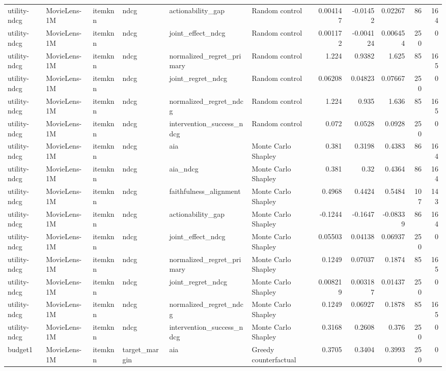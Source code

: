 \begin{table}[t]
{\begin{tabular}{llllllrrrrr}
utility-ndcg & MovieLens-1M & itemknn & ndcg & actionability\_gap & Random control & 0.004147 & -0.01452 & 0.02267 & 86 & 164 \\
utility-ndcg & MovieLens-1M & itemknn & ndcg & joint\_effect\_ndcg & Random control & 0.001172 & -0.004124 & 0.006454 & 250 & 0 \\
utility-ndcg & MovieLens-1M & itemknn & ndcg & normalized\_regret\_primary & Random control & 1.224 & 0.9382 & 1.625 & 85 & 165 \\
utility-ndcg & MovieLens-1M & itemknn & ndcg & joint\_regret\_ndcg & Random control & 0.06208 & 0.04823 & 0.07667 & 250 & 0 \\
utility-ndcg & MovieLens-1M & itemknn & ndcg & normalized\_regret\_ndcg & Random control & 1.224 & 0.935 & 1.636 & 85 & 165 \\
utility-ndcg & MovieLens-1M & itemknn & ndcg & intervention\_success\_ndcg & Random control & 0.072 & 0.0528 & 0.0928 & 250 & 0 \\
utility-ndcg & MovieLens-1M & itemknn & ndcg & aia & Monte Carlo Shapley & 0.381 & 0.3198 & 0.4383 & 86 & 164 \\
utility-ndcg & MovieLens-1M & itemknn & ndcg & aia\_ndcg & Monte Carlo Shapley & 0.381 & 0.32 & 0.4364 & 86 & 164 \\
utility-ndcg & MovieLens-1M & itemknn & ndcg & faithfulness\_alignment & Monte Carlo Shapley & 0.4968 & 0.4424 & 0.5484 & 107 & 143 \\
utility-ndcg & MovieLens-1M & itemknn & ndcg & actionability\_gap & Monte Carlo Shapley & -0.1244 & -0.1647 & -0.08339 & 86 & 164 \\
utility-ndcg & MovieLens-1M & itemknn & ndcg & joint\_effect\_ndcg & Monte Carlo Shapley & 0.05503 & 0.04138 & 0.06937 & 250 & 0 \\
utility-ndcg & MovieLens-1M & itemknn & ndcg & normalized\_regret\_primary & Monte Carlo Shapley & 0.1249 & 0.07037 & 0.1874 & 85 & 165 \\
utility-ndcg & MovieLens-1M & itemknn & ndcg & joint\_regret\_ndcg & Monte Carlo Shapley & 0.008219 & 0.003187 & 0.01437 & 250 & 0 \\
utility-ndcg & MovieLens-1M & itemknn & ndcg & normalized\_regret\_ndcg & Monte Carlo Shapley & 0.1249 & 0.06927 & 0.1878 & 85 & 165 \\
utility-ndcg & MovieLens-1M & itemknn & ndcg & intervention\_success\_ndcg & Monte Carlo Shapley & 0.3168 & 0.2608 & 0.376 & 250 & 0 \\
budget1 & MovieLens-1M & itemknn & target\_margin & aia & Greedy counterfactual & 0.3705 & 0.3404 & 0.3993 & 250 & 0 \\

\end{tabular}}
\end{table}
